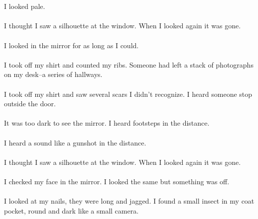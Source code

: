 \documentclass{article}
\begin{document}
    \section{}
    I looked pale. \\\\I thought I saw a silhouette at the window. When I looked again it was gone. \\\\I looked in the mirror for as long as I could. \\\\I took off my shirt and counted my ribs. Someone had left a stack of photographs on my desk--a series of hallways. \\\\I took off my shirt and saw several scars I didn't recognize. I heard someone stop outside the door. \\\\It was too dark to see the mirror. I heard footsteps in the distance. \\\\I heard a sound like a gunshot in the distance. \\\\I thought I saw a silhouette at the window. When I looked again it was gone. \\\\I checked my face in the mirror. I looked the same but something was off. \\\\I looked at my nails, they were long and jagged. I found a small insect in my coat pocket, round and dark like a small camera. \\\\
    \newpage
    
\end{document}
